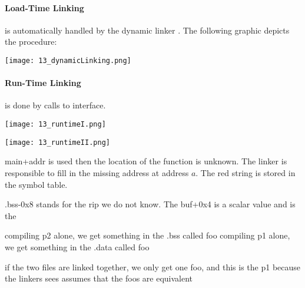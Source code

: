 \paragraph{Load-Time Linking} is automatically handled by the dynamic linker . The following graphic depicts the procedure:

\texttt{[image: 13\_dynamicLinking.png]}

\paragraph{Run-Time Linking} is done by calls to  interface.

\texttt{[image: 13\_runtimeI.png]}

\texttt{[image: 13\_runtimeII.png]}





main+addr is used then the location of the function is unknown. The linker is responsible to fill in the missing address at address $a$. The red string is stored in the symbol table. 

.bss-0x8 stands for the rip we do not know. The buf+0x4 is a scalar value and is the 

compiling p2 alone, we get something in the .bss called foo
compiling p1 alone, we get something in the .data called foo

if the two files are linked together, we only get one foo, and this is the p1 because the linkers sees assumes that the foos are equivalent
